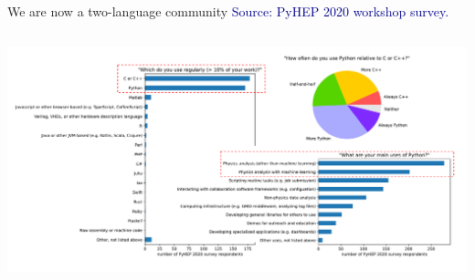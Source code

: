\documentclass[aspectratio=169]{beamer}
\begin{document}
\begin{frame}{We are now a two-language community}
\vspace{0.25 cm}
\textcolor{darkblue}{Source: PyHEP 2020 workshop survey.}

\vspace{-0.3 cm}
\begin{columns}
\includegraphics[width=\linewidth]{PLOTS/pyhep2020-survey-5.pdf}
\end{columns}
\end{frame}
\end{document}
